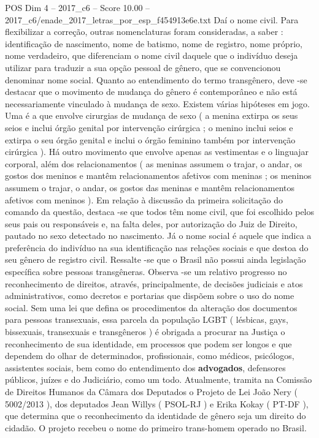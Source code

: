 \begin{textsample}{POS Dim 4 – 2017\_c6 – Score 10.00 – 2017\_c6/enade\_2017\_letras\_por\_esp\_f454913e6e.txt}
Daí o nome civil.
Para flexibilizar a correção, outras nomenclaturas foram consideradas, a saber : identificação de nascimento, nome de batismo, nome de registro, nome próprio, nome verdadeiro, que diferenciam o nome civil daquele que o indivíduo deseja utilizar para traduzir a sua opção pessoal de gênero, que se convencionou denominar nome social.
Quanto ao entendimento do termo transgênero, deve -se destacar que o movimento de mudança do gênero é contemporâneo e não está necessariamente vinculado à mudança de sexo.
Existem várias hipóteses em jogo.
Uma é a que envolve cirurgias de mudança de sexo ( a menina extirpa os seus seios e inclui órgão genital por intervenção cirúrgica ; o menino inclui seios e extirpa o seu órgão genital e inclui o órgão feminino também por intervenção cirúrgica ).
Há outro movimento que envolve apenas as vestimentas e o linguajar corporal, além dos relacionamentos ( as meninas assumem o trajar, o andar, os gostos dos meninos e mantêm relacionamentos afetivos com meninas ; os meninos assumem o trajar, o andar, os gostos das meninas e mantêm relacionamentos afetivos com meninos ).
Em relação à discussão da primeira solicitação do comando da questão, destaca -se que todos têm nome civil, que foi escolhido pelos seus pais ou responsáveis e, na falta deles, por autorização do Juiz de Direito, pautado no sexo detectado no nascimento.
Já o nome social é aquele que indica a preferência do indivíduo na sua identificação nas relações sociais e que destoa do seu gênero de registro civil.
Ressalte -se que o Brasil não possui ainda legislação específica sobre pessoas transgêneras.
Observa -se um relativo progresso no reconhecimento de direitos, através, principalmente, de decisões judiciais e atos administrativos, como decretos e portarias que dispõem sobre o uso do nome social.
Sem uma lei que defina os procedimentos da alteração dos documentos para pessoas transexuais, essa parcela da população LGBT ( lésbicas, gays, bissexuais, transexuais e transgêneros ) é obrigada a procurar na Justiça o reconhecimento de sua identidade, em processos que podem ser longos e que dependem do olhar de determinados, profissionais, como médicos, psicólogos, assistentes sociais, bem como do entendimento dos \textbf{advogados}, defensores públicos, juízes e do Judiciário, como um todo.
Atualmente, tramita na Comissão de Direitos Humanos da Câmara dos Deputados o Projeto de Lei João Nery ( 5002/2013 ), dos deputados Jean Willys ( PSOL-RJ ) e Erika Kokay ( PT-DF ), que determina que o reconhecimento da identidade de gênero seja um direito do cidadão.
O projeto recebeu o nome do primeiro trans-homem operado no Brasil.

\end{textsample}
